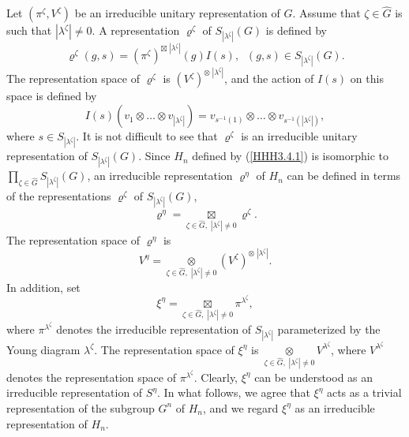 \documentclass[12pt]{amsart}
\theoremstyle{definition}
\numberwithin{equation}{section}
\begin{document}
Let $\left(\pi^{\zeta},V^{\zeta}\right)$ be an irreducible unitary representation of $G$.
Assume that $\zeta\in\widehat{G}$ is such that $|\lambda^{\zeta}|\neq 0$.
A representation $\varrho^{\zeta}$ of $S_{|\lambda^{\zeta}|}(G)$ is defined by
\begin{equation}\label{HHH3.5.1}
\varrho^{\zeta}(g,s)=\left(\pi^{\zeta}\right)^{\boxtimes\; |\lambda^{\zeta}|}
(g)I(s),\;\;(g,s)\in S_{|\lambda^{\zeta}|}(G).
\end{equation}
The representation space of $\varrho^{\zeta}$ is $\left(V^{\zeta}\right)^{\otimes\;|\lambda^{\zeta}|}$, and the action of $I(s)$ on this space is defined by
\begin{equation}\label{HHH3.5.2}
I(s)\left(v_1\otimes\ldots\otimes v_{|\lambda^{\zeta}|}\right)=
v_{s^{-1}(1)}\otimes\ldots\otimes v_{s^{-1}(|\lambda^{\zeta}|)},
\end{equation}
where $s\in S_{|\lambda^{\zeta}|}$. It is not difficult to see that $\varrho^{\zeta}$ is an irreducible unitary representation of $S_{|\lambda^{\zeta}|}(G)$.
Since $H_n$ defined by (\ref{HHH3.4.1}) is isomorphic to $\prod\limits_{\zeta\in\widehat{G}}S_{|\lambda^{\zeta}|}(G)$, an irreducible representation
$\varrho^{\eta}$ of $H_n$ can be defined in terms of the representations
$\varrho^{\zeta}$ of $S_{|\lambda^{\zeta}|}(G)$,
\begin{equation}
\varrho^{\eta}=\underset{\zeta\in\widehat{G},\; |\lambda^{\zeta}|\neq 0}{\boxtimes}\varrho^{\zeta}.
\end{equation}
The representation space of
$\varrho^{\eta}$ is
$$
V^{\eta}=\underset{\zeta\in\widehat{G},\; |\lambda^{\zeta}|\neq 0}{\otimes}
\left(V^{\zeta}\right)^{\otimes\;|\lambda^{\zeta}|}.
$$
In addition, set
$$
\xi^{\eta}=\underset{\zeta\in\widehat{G},\; |\lambda^{\zeta}|\neq 0}{\boxtimes}\pi^{\lambda^\zeta},
$$
where $\pi^{\lambda^{\zeta}}$ denotes the irreducible representation of $S_{|\lambda^{\zeta}|}$ parameterized by the Young diagram $\lambda^{\zeta}$. The representation space of $\xi^{\eta}$ is $\underset{\zeta\in\widehat{G},\; |\lambda^{\zeta}|\neq 0}{\otimes}
V^{\lambda^{\zeta}}$, where $V^{\lambda^{\zeta}}$ denotes the representation space of $\pi^{\lambda^{\zeta}}$. Clearly, $\xi^{\eta}$ can be understood as an irreducible representation of $S^{\eta}$. In what follows, we agree that $\xi^{\eta}$ acts as a trivial representation of the subgroup $G^n$ of $H_n$, and we regard $\xi^{\eta}$ as an irreducible representation of $H_n$.
\end{document}
